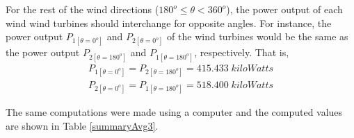     For the rest of the wind directions ($180^o\leq \theta<360^o$), the power output of each wind wind turbines should interchange for opposite angles. For instance, the power output $P_{1[\theta=0^o]}$ and $P_{2[\theta=0^o]}$ of the wind turbines would be the same as the power output $P_{2[\theta=180^o]}$ and $P_{1[\theta=180^o]}$, respectively. That is,
    \begin{align*}
        P_{1[\theta=0^o]} = P_{2[\theta=180^o]} = 415.433\;kiloWatts \\
        P_{2[\theta=0^o]} = P_{1[\theta=180^o]} = 518.400\;kiloWatts
    \end{align*}
    
    The same computations were made using a computer and the computed values are shown in Table \ref{summaryAvg3}.
    
    \singlespacing
